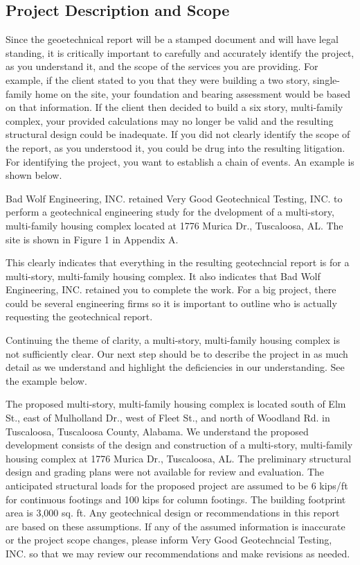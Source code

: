 \documentclass[12pt]{article}
\begin{document}
\pagebreak

\subsection{Project Description and Scope}
Since the geoetechnical report will be a stamped document and will have legal standing, it is critically important to carefully and accurately identify the project, as you understand it, and the scope of the services you are providing. For example, if the client stated to you that they were building a two story, single-family home on the site, your foundation and bearing assessment would be based on that information. If the client then decided to build a six story, multi-family complex, your provided calculations may no longer be valid and the resulting structural design could be inadequate. If you did not clearly identify the scope of the report, as you understood it, you could be drug into the resulting litigation. For identifying the project, you want to establish a chain of events. An example is shown below.

\begin{letter}
Bad Wolf Engineering, INC. retained Very Good Geotechnical Testing, INC. to perform a geotechnical engineering study for the dvelopment of a multi-story, multi-family housing complex located at 1776 Murica Dr., Tuscaloosa, AL. The site is shown in Figure 1 in Appendix A.
\end{letter}

This clearly indicates that everything in the resulting geotechncial report is for a multi-story, multi-family housing complex. It also indicates that Bad Wolf Engineering, INC. retained you to complete the work. For a big project, there could be several engineering firms so it is important to outline who is actually requesting the geotechnical report.

Continuing the theme of clarity, a multi-story, multi-family housing complex is not sufficiently clear. Our next step should be to describe the project in as much detail as we understand and highlight the deficiencies in our understanding. See the example below.

\begin{letter}
The proposed multi-story, multi-family housing complex is located south of Elm St., east of Mulholland Dr., west of Fleet St., and north of Woodland Rd. in Tuscaloosa, Tuscaloosa County, Alabama. We understand the proposed development consists of the design and construction of a multi-story, multi-family housing complex at 1776 Murica Dr., Tuscaloosa, AL. The preliminary structural design and grading plans were not available for review and evaluation. The anticipated structural loads for the proposed project are assumed to be 6 kips/ft for continuous footings and 100 kips for column footings. The building footprint area is 3,000 sq. ft. Any geotechnical design or recommendations in this report are based on these assumptions. If any of the assumed information is inaccurate or the project scope changes, please inform Very Good Geotechncial Testing, INC. so that we may review our recommendations and make revisions as needed.
\end{letter}
\end{document}
